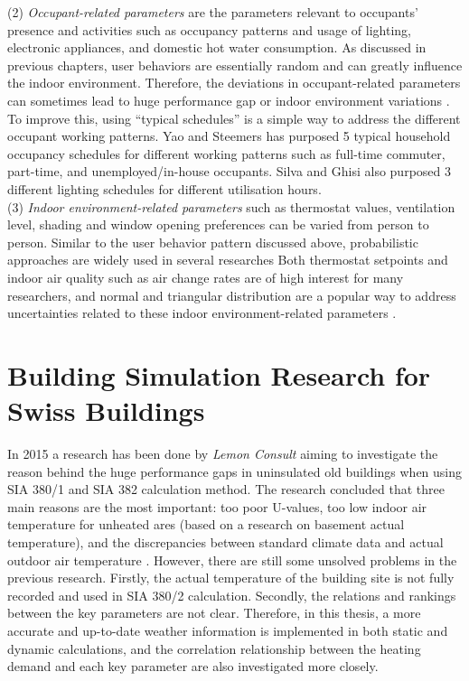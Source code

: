 \documentclass[a4paper, oneside]{discothesis}
\begin{document}
		(2) \textit{Occupant-related parameters} are the parameters relevant to occupants' presence and activities such as occupancy patterns and usage of lighting, electronic appliances, and domestic hot water consumption. As discussed in previous chapters, user behaviors are essentially random and can greatly influence the indoor environment. Therefore, the deviations in occupant-related parameters can sometimes lead to huge performance gap or indoor environment variations \cite{GeorgeThesis}. To improve this, using ``typical schedules'' is a simple way to address the different occupant working patterns. Yao and Steemers \cite{yao2005method} has purposed 5 typical household occupancy schedules for different working patterns such as full-time commuter, part-time, and unemployed/in-house occupants. Silva and Ghisi \cite{silva2014uncertainty} also purposed 3 different lighting schedules for different utilisation hours.\\

		(3) \textit{Indoor environment-related parameters} such as thermostat values, ventilation level, shading and window opening preferences can be varied from person to person. Similar to the user behavior pattern discussed above, probabilistic approaches are widely used in several researches \cite{GeorgeThesis} Both thermostat setpoints and indoor air quality such as air change rates are of high interest for many researchers, and normal and triangular distribution are a popular way to address uncertainties related to these indoor environment-related parameters \cite{GeorgeThesis}. 

	\section{Building Simulation Research for Swiss Buildings}
		In 2015 a research has been done by \textit{Lemon Consult} \cite{SIAPreviousreport} aiming to investigate the reason behind the huge performance gaps in uninsulated old buildings when using SIA 380/1 and SIA 382 calculation method. The research concluded that three main reasons are the most important: too poor U-values, too low indoor air temperature for unheated ares (based on a research on basement actual temperature), and the discrepancies between standard climate data and actual outdoor air temperature \cite{SIAPreviousreport}. However, there are still some unsolved problems in the previous research. Firstly, the actual temperature of the building site is not fully recorded and used in SIA 380/2 calculation. Secondly, the relations and rankings between the key parameters are not clear. Therefore, in this thesis, a more accurate and up-to-date weather information is implemented in both static and dynamic calculations, and the correlation relationship between the heating demand and each key parameter are also investigated more closely.
\end{document}
